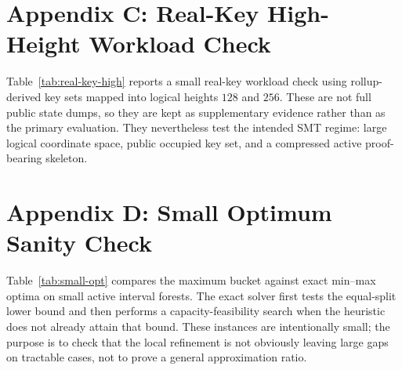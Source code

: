 \section*{Appendix C: Real-Key High-Height Workload Check}
\label{app:real-key-high}

Table~\ref{tab:real-key-high} reports a small real-key workload check using rollup-derived key sets mapped into logical heights $128$ and $256$. These are not full public state dumps, so they are kept as supplementary evidence rather than as the primary evaluation. They nevertheless test the intended SMT regime: large logical coordinate space, public occupied key set, and a compressed active proof-bearing skeleton.

\begin{table}[H]
\centering
\caption{Supplementary real-key high-height workload summary}
\label{tab:real-key-high}
\scriptsize
\setlength{\tabcolsep}{2.2pt}
\end{table}

\section*{Appendix D: Small Optimum Sanity Check}
\label{app:small-opt}

Table~\ref{tab:small-opt} compares the \ActiveBalance{} maximum bucket against exact min--max optima on small active interval forests. The exact solver first tests the equal-split lower bound and then performs a capacity-feasibility search when the heuristic does not already attain that bound. These instances are intentionally small; the purpose is to check that the local refinement is not obviously leaving large gaps on tractable cases, not to prove a general approximation ratio.

